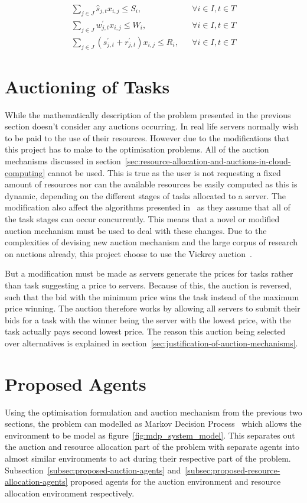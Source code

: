 \begin{align}
    \sum_{j \in J} \hat{s}_{j,t} x_{i,j} \leq S_i, && \forall{i \in I, t \in T} \label{eq:server_storage_capacity} \\
    \sum_{j \in J} w^{'}_{j,t} x_{i,j} \leq W_i, && \forall{i \in I, t \in T} \label{eq:server_computation_capacity} \\
    \sum_{j \in J} (s^{'}_{j,t} + r^{'}_{j,t}) x_{i,j} \leq R_i, && \forall{i \in I, t \in T} \label{eq:server_bandwidth_capacity}
\end{align}

\section{Auctioning of Tasks}\label{sec:auctioning-of-tasks}
While the mathematically description of the problem presented in the previous section doesn't consider any auctions
occurring. In real life servers normally wish to be paid to the use of their resources. However due to the modifications
that this project has to make to the optimisation problems. All of the auction mechanisms discussed in
section~\ref{sec:resource-allocation-and-auctions-in-cloud-computing} cannot be used. This is true as the user is not
requesting a fixed amount of resources nor can the available resources be easily computed as this is dynamic, depending
on the different stages of tasks allocated to a server. The modification also affect the algorithms presented
in~\cite{FlexibleResourceAllocation} as they assume that all of the task stages can occur concurrently. This means that
a novel or modified auction mechanism must be used to deal with these changes. Due to the complexities of devising new
auction mechanism and the large corpus of research on auctions already, this project choose to use the Vickrey
auction~\citep{vickrey}.

But a modification must be made as servers generate the prices for tasks rather than task suggesting a price to servers.
Because of this, the auction is reversed, such that the bid with the minimum price wins the task instead of the maximum
price winning. The auction therefore works by allowing all servers to submit their bids for a task with the winner
being the server with the lowest price, with the task actually pays second lowest price. The reason this auction being
selected over alternatives is explained in section~\ref{sec:justification-of-auction-mechanisms}.

\section{Proposed Agents}\label{sec:proposed-agents}
Using the optimisation formulation and auction mechanism from the previous two sections, the problem can modelled as
Markov Decision Process~\cite{Bel} which allows the environment to be model as figure~\ref{fig:mdp_system_model}.
This separates out the auction and resource allocation part of the problem with
separate agents into almost similar environments to act during their respective part of the problem.
Subsection~\ref{subsec:proposed-auction-agents} and~\ref{subsec:proposed-resource-allocation-agents} proposed agents
for the auction environment and resource allocation environment respectively.

